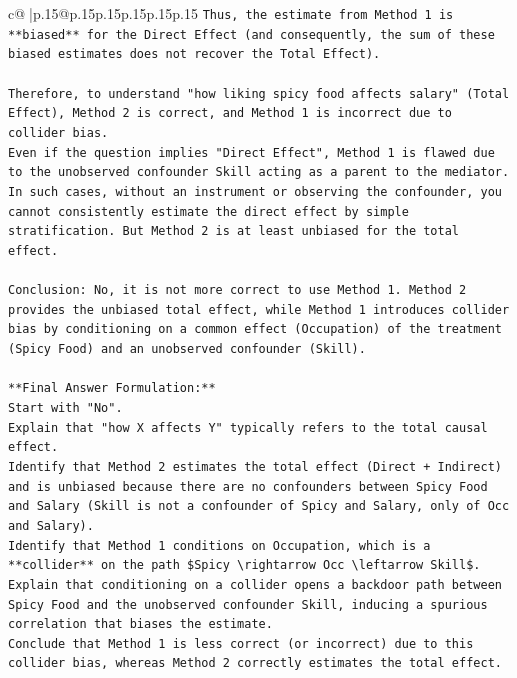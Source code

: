 \documentclass{article}
\begin{document}
{\begin{supertabular}{c@{$\;$}|p{.15\linewidth}@{}p{.15\linewidth}p{.15\linewidth}p{.15\linewidth}p{.15\linewidth}p{.15\linewidth}}
{{{\texttt{Thus, the estimate from Method 1 is **biased** for the Direct Effect (and consequently, the sum of these biased estimates does not recover the Total Effect).} \\
\\ 
\texttt{Therefore, to understand "how liking spicy food affects salary" (Total Effect), Method 2 is correct, and Method 1 is incorrect due to collider bias.} \\
\texttt{Even if the question implies "Direct Effect", Method 1 is flawed due to the unobserved confounder Skill acting as a parent to the mediator. In such cases, without an instrument or observing the confounder, you cannot consistently estimate the direct effect by simple stratification. But Method 2 is at least unbiased for the total effect.} \\
\\ 
\texttt{Conclusion: No, it is not more correct to use Method 1. Method 2 provides the unbiased total effect, while Method 1 introduces collider bias by conditioning on a common effect (Occupation) of the treatment (Spicy Food) and an unobserved confounder (Skill).} \\
\\ 
\texttt{**Final Answer Formulation:**} \\
\texttt{Start with "No".} \\
\texttt{Explain that "how X affects Y" typically refers to the total causal effect.} \\
\texttt{Identify that Method 2 estimates the total effect (Direct + Indirect) and is unbiased because there are no confounders between Spicy Food and Salary (Skill is not a confounder of Spicy and Salary, only of Occ and Salary).} \\
\texttt{Identify that Method 1 conditions on Occupation, which is a **collider** on the path \$Spicy \textbackslash{}rightarrow Occ \textbackslash{}leftarrow Skill\$.} \\
\texttt{Explain that conditioning on a collider opens a backdoor path between Spicy Food and the unobserved confounder Skill, inducing a spurious correlation that biases the estimate.} \\
\texttt{Conclude that Method 1 is less correct (or incorrect) due to this collider bias, whereas Method 2 correctly estimates the total effect.} \\
\\ 
}}}
\end{supertabular}}
\end{document}
